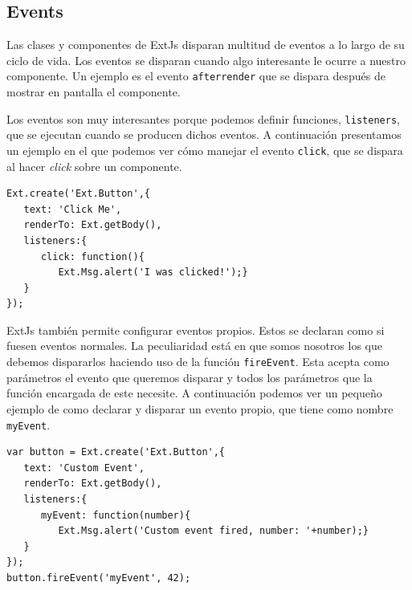 	\subsection{Events}
		Las clases y componentes de ExtJs disparan multitud de eventos a lo largo de su ciclo de vida. Los eventos se disparan cuando algo
		interesante le ocurre a nuestro componente. Un ejemplo es el evento \texttt{afterrender} que se dispara después de mostrar en pantalla
		el componente.
		\par
		Los eventos son muy interesantes porque podemos definir funciones, \texttt{listeners}, que se ejecutan cuando se producen dichos
		eventos. A continuación presentamos un ejemplo en el que podemos ver cómo manejar el evento \texttt{click}, que se dispara al hacer
		\emph{click} sobre un componente. 
		\begin{lstlisting}[style=myJs]
Ext.create('Ext.Button',{
   text: 'Click Me',
   renderTo: Ext.getBody(),
   listeners:{
      click: function(){
         Ext.Msg.alert('I was clicked!');}
   }
});
		\end{lstlisting}
		\par
		ExtJs también permite configurar eventos propios. Estos se declaran como si fuesen eventos normales. La peculiaridad está en que somos
		nosotros los que debemos dispararlos haciendo uso de la función \texttt{fireEvent}. Esta acepta como parámetros el evento que queremos
		disparar y todos los parámetros que la función encargada de este necesite. A continuación podemos ver un pequeño ejemplo de como
		declarar y disparar un evento propio, que tiene como nombre \texttt{myEvent}.
		\begin{lstlisting}[style=myJs]
var button = Ext.create('Ext.Button',{
   text: 'Custom Event',
   renderTo: Ext.getBody(),
   listeners:{
      myEvent: function(number){
         Ext.Msg.alert('Custom event fired, number: '+number);}
   }
});
button.fireEvent('myEvent', 42);
		\end{lstlisting}
